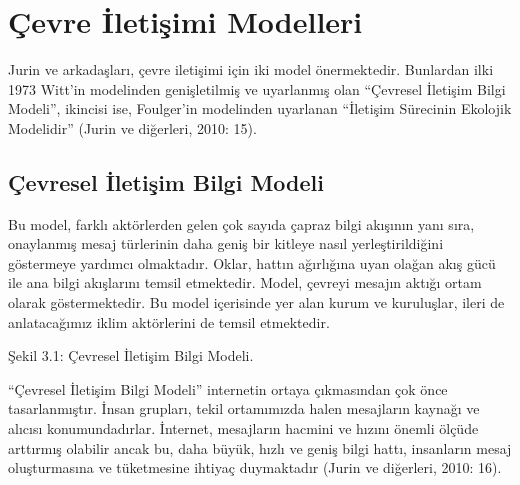 \documentclass[
]{book}
\begin{document}
\hypertarget{uxe7evre-iletiux15fimi-modelleri}{%
\section{Çevre İletişimi Modelleri}\label{uxe7evre-iletiux15fimi-modelleri}}

Jurin ve arkadaşları, çevre iletişimi için iki model önermektedir. Bunlardan ilki 1973 Witt'in modelinden genişletilmiş ve uyarlanmış olan ``Çevresel İletişim Bilgi Modeli'', ikincisi ise, Foulger'in modelinden uyarlanan ``İletişim Sürecinin Ekolojik Modelidir'' (Jurin ve diğerleri, 2010: 15).

\hypertarget{uxe7evresel-iletiux15fim-bilgi-modeli}{%
\subsection{Çevresel İletişim Bilgi Modeli}\label{uxe7evresel-iletiux15fim-bilgi-modeli}}

Bu model, farklı aktörlerden gelen çok sayıda çapraz bilgi akışının yanı sıra, onaylanmış mesaj türlerinin daha geniş bir kitleye nasıl yerleştirildiğini göstermeye yardımcı olmaktadır. Oklar, hattın ağırlığına uyan olağan akış gücü ile ana bilgi akışlarını temsil etmektedir. Model, çevreyi mesajın aktığı ortam olarak göstermektedir. Bu model içerisinde yer alan kurum ve kuruluşlar, ileri de anlatacağımız iklim aktörlerini de temsil etmektedir.

Şekil 3.1: Çevresel İletişim Bilgi Modeli.

``Çevresel İletişim Bilgi Modeli'' internetin ortaya çıkmasından çok önce tasarlanmıştır. İnsan grupları, tekil ortamımızda halen mesajların kaynağı ve alıcısı konumundadırlar. İnternet, mesajların hacmini ve hızını önemli ölçüde arttırmış olabilir ancak bu, daha büyük, hızlı ve geniş bilgi hattı, insanların mesaj oluşturmasına ve tüketmesine ihtiyaç duymaktadır (Jurin ve diğerleri, 2010: 16).
\end{document}
